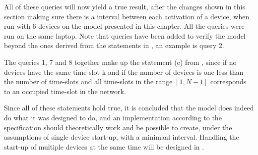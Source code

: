 All of these queries will now yield a true result, after the changes shown in this section making sure there is a interval between each activation of a device, when run with 6 devices on the model presented in this chapter.
All the queries were run on the same laptop.
Note that queries have been added to verify the model beyond the ones derived from the statements in , an example is query 2.

The queries 1, 7 and 8 together make up the statement (e) from , since if no devices have the same time-slot k and if the number of devices is one less than the number of time-slots and all time-slots in the range $[1, N-1]$ corresponds to an occupied time-slot in the network.

Since all of these statements hold true, it is concluded that the model does indeed do what it was designed to do, and an implementation according to the specification should theoretically work and be possible to create, under the assumptions of single device start-up, with a minimaal interval.
Handling the start-up of multiple devices at the same time will be designed in .
\newpage
